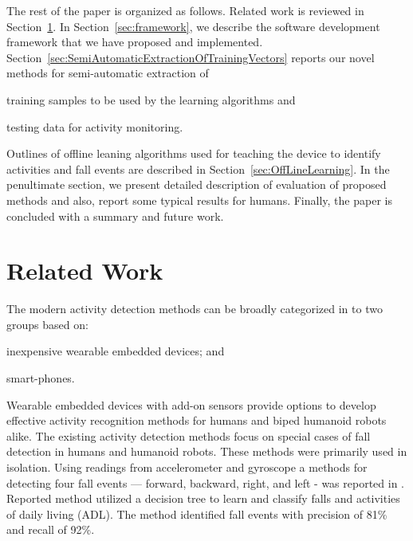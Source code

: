 \documentclass{IEEEtran}
\begin{document}
The rest of the paper is organized as follows. Related work is reviewed in Section~\ref{subSec:relatedWork}. In Section~\ref{sec:framework}, we describe the software development 
framework that we have proposed and implemented.
Section~\ref{sec:SemiAutomaticExtractionOfTrainingVectors} reports our novel methods for  
semi-automatic extraction  of \begin{inparaenum} [($i$)] \item training samples to be 
used by the learning algorithms  and \item testing data for activity monitoring. 
\end{inparaenum} Outlines of offline leaning algorithms used for teaching the device to 
identify activities and fall events are described in Section~\ref{sec:OffLineLearning}. 
 In the penultimate section, we present detailed description of evaluation of proposed methods and also, report some typical results for humans.
Finally, the paper is concluded with a summary and future work.  

\section{Related Work}
\label{subSec:relatedWork}

The modern activity detection methods can be broadly categorized in to two groups based on: 
\begin{inparaenum}[($i$)] \item inexpensive wearable embedded devices; and \item smart-phones. 
\end{inparaenum} Wearable embedded devices with add-on sensors provide options to develop effective 
activity recognition methods for humans and biped humanoid robots alike. The existing activity 
detection methods focus on special cases of fall detection in humans and humanoid robots. These 
methods were primarily used in isolation.  Using readings from accelerometer and gyroscope a methods for detecting four fall events --- forward, backward, right, and left - was reported in \cite{ojetolaFallDetection2011}.  Reported method utilized  a decision tree to 
learn and classify falls and activities of daily living (ADL). The method identified fall events 
with precision of 81\%  and recall of 92\%. 
\end{document}
